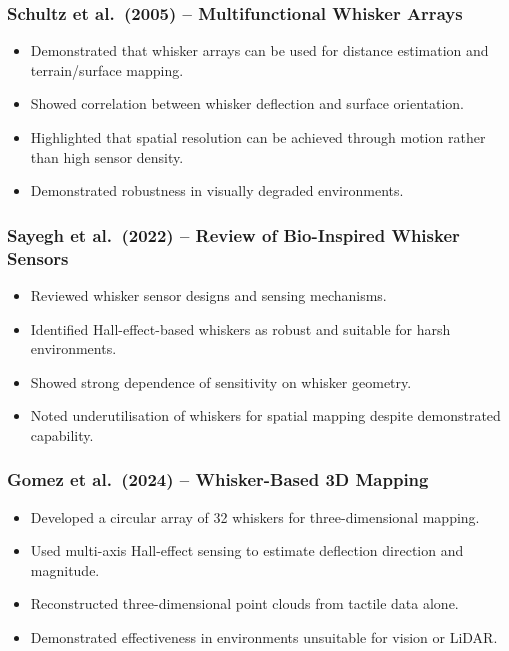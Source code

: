 \documentclass[11pt,a4paper]{article}
\begin{document}
\subsubsection*{Schultz et al.\ (2005) -- Multifunctional Whisker Arrays}

\begin{itemize}
    \item Demonstrated that whisker arrays can be used for distance estimation and terrain/surface mapping.
    \item Showed correlation between whisker deflection and surface orientation.
    \item Highlighted that spatial resolution can be achieved through motion rather than high sensor density.
    \item Demonstrated robustness in visually degraded environments.
\end{itemize}

\subsubsection*{Sayegh et al.\ (2022) -- Review of Bio-Inspired Whisker Sensors}

\begin{itemize}
    \item Reviewed whisker sensor designs and sensing mechanisms.
    \item Identified Hall-effect-based whiskers as robust and suitable for harsh environments.
    \item Showed strong dependence of sensitivity on whisker geometry.
    \item Noted underutilisation of whiskers for spatial mapping despite demonstrated capability.
\end{itemize}

\subsubsection*{Gomez et al.\ (2024) -- Whisker-Based 3D Mapping}

\begin{itemize}
    \item Developed a circular array of 32 whiskers for three-dimensional mapping.
    \item Used multi-axis Hall-effect sensing to estimate deflection direction and magnitude.
    \item Reconstructed three-dimensional point clouds from tactile data alone.
    \item Demonstrated effectiveness in environments unsuitable for vision or LiDAR.
\end{itemize}
\end{document}
